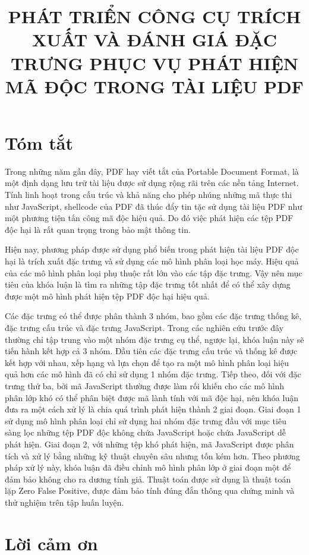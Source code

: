\documentclass[12pt,a4paper]{report}
\title{PHÁT TRIỂN CÔNG CỤ TRÍCH XUẤT VÀ ĐÁNH GIÁ ĐẶC TRƯNG PHỤC VỤ PHÁT HIỆN MÃ ĐỘC TRONG TÀI LIỆU PDF}
\begin{document}

\clearpage{}

\chapter*{Tóm tắt}
Trong những năm gần đây, PDF hay viết tắt của Portable Document Format, là một định dạng lưu trữ tài liệu được sử dụng rộng rãi trên các nền tảng Internet. Tính linh hoạt trong cấu trúc và khả năng cho phép nhúng những mã thực thi như JavaScript, shellcode của PDF đã thúc đẩy tin tặc sử dụng tài liệu PDF như một phương tiện tấn công mã độc hiệu quả. Do đó việc phát hiện các tệp PDF độc hại là rất quan trọng trong bảo mật thông tin.

Hiện nay, phương pháp được sử dụng phổ biến trong phát hiện tài liệu PDF độc hại là trích xuất đặc trưng và sử dụng các mô hình phân loại học máy. Hiệu quả của các mô hình phân loại phụ thuộc rất lớn vào các tập đặc trưng. Vậy nên mục tiêu của khóa luận là tìm ra những tập đặc trưng tốt nhất để có thể xây dựng được một mô hình phát hiện tệp PDF độc hại hiệu quả.

Các đặc trưng có thể được phân thành 3 nhóm, bao gồm các đặc trưng thống kê, đặc trưng cấu trúc và đặc trưng JavaScript. Trong các nghiên cứu trước đây thường chỉ tập trung vào một nhóm đặc trưng cụ thể, ngược lại, khóa luận này sẽ tiến hành kết hợp cả 3 nhóm. Đầu tiên các đặc trưng cấu trúc và thống kê được kết hợp với nhau, xếp hạng và lựa chọn để tạo ra một mô hình phân loại hiệu quả hơn các mô hình đã có chỉ sử dụng 1 nhóm đặc trưng. Tiếp theo, đối với đặc trưng thứ ba, bởi mã JavaScript thường được làm rối khiến cho các mô hình phân lớp khó có thể phân biệt được mã lành tính với mã độc hại, nên khóa luận đưa ra một cách xử lý là chia quá trình phát hiện thành 2 giai đoạn. Giai đoạn 1 sử dụng mô hình phân loại chỉ sử dụng hai nhóm đặc trưng đầu với mục tiêu sàng lọc những tệp PDF độc không chứa JavaScript hoặc chứa JavaScript dễ phát hiện. Giai đoạn 2, với những tệp khó phát hiện, mã JavaScript được phân tích và xử lý bằng những kỹ thuật chuyên sâu nhưng tốn kém hơn. Theo phương pháp xử lý này, khóa luận đã điều chỉnh mô hình phân lớp ở giai đoạn một để đảm bảo không cho ra dương tính giả. Thuật toán được sử dụng là thuật toán lặp Zero False Positive, được đảm bảo tính đúng đắn thông qua chứng minh và thử nghiệm trên tập huấn luyện.

\chapter*{Lời cảm ơn}
\end{document}
